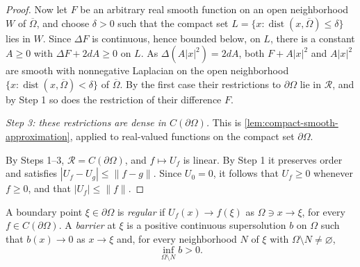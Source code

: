 \begin{proof}
Now let $F$ be an arbitrary real smooth function on an open neighborhood $W$ of $\overline\Omega$, and choose $\delta>0$ such that the compact set $L=\{x:\operatorname{dist}(x,\overline\Omega)\leq\delta\}$ lies in $W$. Since $\Delta F$ is continuous, hence bounded below, on $L$, there is a constant $A\geq0$ with $\Delta F+2dA\geq0$ on $L$. As $\Delta(A|x|^2)=2dA$, both $F+A|x|^2$ and $A|x|^2$ are smooth with nonnegative Laplacian on the open neighborhood $\{x:\operatorname{dist}(x,\overline\Omega)<\delta\}$ of $\overline\Omega$. By the first case their restrictions to $\partial\Omega$ lie in $\mathcal R$, and by Step 1 so does the restriction of their difference $F$.

\emph{Step 3: these restrictions are dense in $C(\partial\Omega)$.} This is \cref{lem:compact-smooth-approximation}, applied to real-valued functions on the compact set $\partial\Omega$.

By Steps 1--3, $\mathcal R=C(\partial\Omega)$, and $f\mapsto U_f$ is linear. By Step 1 it preserves order and satisfies $|U_f-U_g|\leq\|f-g\|$. Since $U_0=0$, it follows that $U_f\geq0$ whenever $f\geq0$, and that $|U_f|\leq\|f\|$.
\end{proof}

\begin{definition}\label{def:boundary-barrier}
A boundary point $\xi\in\partial\Omega$ is \emph{regular} if $U_f(x)\to f(\xi)$ as $\Omega\ni x\to\xi$, for every $f\in C(\partial\Omega)$. A \emph{barrier} at $\xi$ is a positive continuous supersolution $b$ on $\Omega$ such that $b(x)\to0$ as $x\to\xi$ and, for every neighborhood $N$ of $\xi$ with $\Omega\setminus N\neq\varnothing$,
\[
 \inf_{\Omega\setminus N}b>0.
\]
\end{definition}

